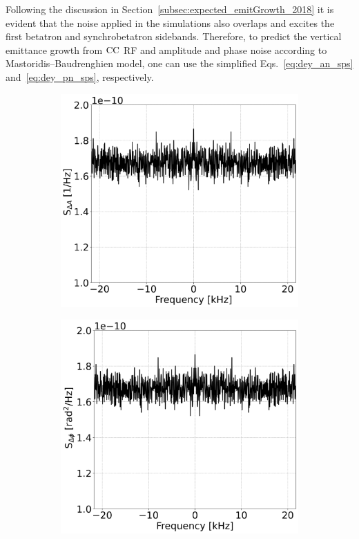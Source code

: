 Following the discussion in Section~\ref{subsec:expected_emitGrowth_2018} it is evident that the noise applied in the simulations also overlaps and excites the first betatron and synchrobetatron sidebands. Therefore, to predict the vertical emittance growth from ${\mathrm{CC}}$ RF and amplitude and phase noise according to Mastoridis--Baudrenghien model, one can use the simplified Eqs.~\eqref{eq:dey_an_sps} and~\eqref{eq:dey_pn_sps}, respectively.


\begin{figure}[htp]
    \centering
    \begin{subfigure}{.45\textwidth}
        \centering
        \includegraphics[width=.95\linewidth]{images/Ch6/psd_amplitude_noise_example.png}  
    \end{subfigure}
    \begin{subfigure}{.45\textwidth}
        \centering
        \includegraphics[width=.95\linewidth]{images/Ch6/psd_phase_noise_example.png}

\end{subfigure}
\end{figure}
